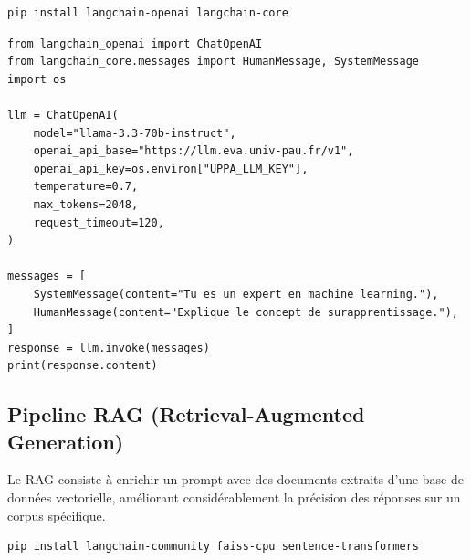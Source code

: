 \documentclass[12pt, a4paper, twoside]{article}
\begin{document}
\begin{lstlisting}[style=bashstyle]
pip install langchain-openai langchain-core
\end{lstlisting}

\begin{lstlisting}[style=pythonstyle, caption={LangChain pointant sur le cluster EVA}]
from langchain_openai import ChatOpenAI
from langchain_core.messages import HumanMessage, SystemMessage
import os

llm = ChatOpenAI(
    model="llama-3.3-70b-instruct",
    openai_api_base="https://llm.eva.univ-pau.fr/v1",
    openai_api_key=os.environ["UPPA_LLM_KEY"],
    temperature=0.7,
    max_tokens=2048,
    request_timeout=120,
)

messages = [
    SystemMessage(content="Tu es un expert en machine learning."),
    HumanMessage(content="Explique le concept de surapprentissage."),
]
response = llm.invoke(messages)
print(response.content)
\end{lstlisting}

\subsection{Pipeline RAG (Retrieval-Augmented Generation)}

Le RAG consiste à enrichir un prompt avec des documents extraits d'une base de données
vectorielle, améliorant considérablement la précision des réponses sur un corpus spécifique.

\begin{lstlisting}[style=bashstyle]
pip install langchain-community faiss-cpu sentence-transformers
\end{lstlisting}
\end{document}
